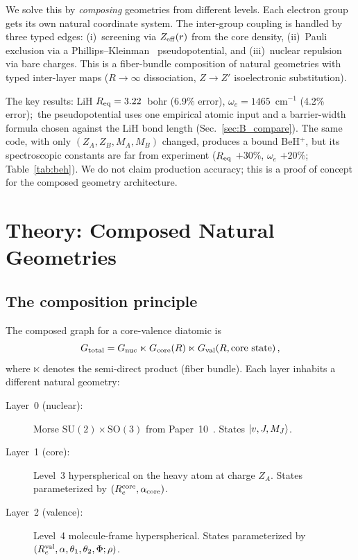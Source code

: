 \documentclass[aps,pra,twocolumn,superscriptaddress,longbibliography,floatfix]{revtex4-2}
\begin{document}
We solve this by \emph{composing} geometries from different levels.
Each electron group gets its own natural coordinate system.
The inter-group coupling is handled by three typed edges:
(i)~screening via $Z_{\rm eff}(r)$ from the core density,
(ii)~Pauli exclusion via a Phillips--Kleinman~\cite{pk1959}
pseudopotential, and
(iii)~nuclear repulsion via bare charges.
This is a fiber-bundle composition of natural
geometries with typed inter-layer maps ($R\to\infty$ dissociation,
$Z\to Z'$ isoelectronic substitution).

The key results: LiH $R_{\rm eq} = 3.22$~bohr (6.9\% error),
$\omega_e = 1465$~cm$^{-1}$ (4.2\% error);\ the pseudopotential uses one
empirical atomic input and a barrier-width formula chosen against the
LiH bond length (Sec.~\ref{sec:B_compare}).  The same code, with only
$(Z_A, Z_B, M_A, M_B)$ changed, produces a bound BeH$^+$, but its
spectroscopic constants are far from experiment ($R_{\rm eq}$ $+30\%$,
$\omega_e$ $+20\%$; Table~\ref{tab:beh}).  We do not claim production accuracy; this is a proof of
concept for the composed geometry architecture.


\section{Theory: Composed Natural Geometries}
\label{sec:theory}

\subsection{The composition principle}
\label{sec:composition}

The composed graph for a core-valence diatomic is
\begin{equation}
  G_{\rm total} = G_{\rm nuc} \ltimes G_{\rm core}(R)
    \ltimes G_{\rm val}(R, \text{core state})\,,
  \label{eq:Gtotal}
\end{equation}
where $\ltimes$ denotes the semi-direct product (fiber bundle).
Each layer inhabits a different natural geometry:

\begin{description}
\item[Layer~0 (nuclear):]
  Morse $\text{SU}(2) \times \text{SO}(3)$ from Paper~10~\cite{paper10}.
  States $\ket{v, J, M_J}$.

\item[Layer~1 (core):]
  Level~3 hyperspherical on the heavy atom at charge $Z_A$.
  States parameterized by $(R_e^{\rm core}, \alpha_{\rm core})$.

\item[Layer~2 (valence):]
  Level~4 molecule-frame hyperspherical.
  States parameterized by
  $(R_e^{\rm val}, \alpha, \theta_1, \theta_2, \Phi; \rho)$.
\end{description}
\end{document}
